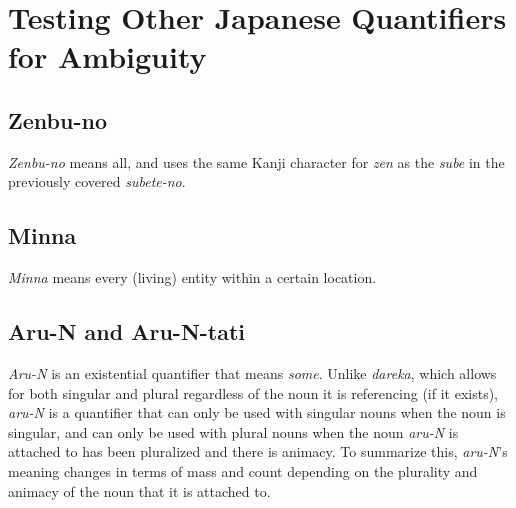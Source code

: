 \documentclass[english, 11pt]{article}
\newcommand{\vs}{\vspace{12pt}}  %
\begin{document}
\section{Testing Other Japanese Quantifiers for Ambiguity}
\vs 

\subsection{Zenbu-no}
\emph{Zenbu-no} means all, and uses the same Kanji character for \emph{zen} as the \emph{sube} in the previously covered \emph{subete-no}. 
\vs

\subsection{Minna}
\emph{Minna} means every (living) entity within a certain location.
\vs

\subsection{Aru-N and Aru-N-tati}
\emph{Aru-N} is an existential quantifier that means \emph{some}. Unlike \emph{dareka}, which allows for both singular and plural regardless of the noun it is referencing (if it exists), \emph{aru-N} is a quantifier that can only be used with singular nouns when the noun is singular, and can only be used with plural nouns when the noun \emph{aru-N} is attached to has been pluralized and there is animacy. To summarize this, \emph{aru-N}'s meaning changes in terms of mass and count depending on the plurality and animacy of the noun that it is attached to.
\begin{exe}
	\ex 
	\begin{xlist}
		\label{1a}
		\label{1b}
		\label{1b}
		\label{1b}
	\end{xlist}
\end{exe}
\vs
\end{document}
